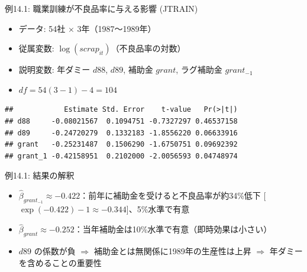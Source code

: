 \documentclass[
  ignorenonframetext,
]{beamer}
\newenvironment{Shaded}{\begin{snugshade}}{\end{snugshade}}
\newcommand{\AttributeTok}[1]{\textcolor[rgb]{0.13,0.29,0.53}{#1}}
\newcommand{\FunctionTok}[1]{\textcolor[rgb]{0.13,0.29,0.53}{\textbf{#1}}}
\newcommand{\NormalTok}[1]{#1}
\newcommand{\OtherTok}[1]{\textcolor[rgb]{0.56,0.35,0.01}{#1}}
\newcommand{\SpecialCharTok}[1]{\textcolor[rgb]{0.81,0.36,0.00}{\textbf{#1}}}
\newcommand{\StringTok}[1]{\textcolor[rgb]{0.31,0.60,0.02}{#1}}
\providecommand{\tightlist}{%
  \setlength{\itemsep}{0pt}\setlength{\parskip}{0pt}}
\begin{document}
\begin{frame}[fragile]{例14.1: 職業訓練が不良品率に与える影響 (JTRAIN)}
\label{ux4f8b14.1-ux8077ux696dux8a13ux7df4ux304cux4e0dux826fux54c1ux7387ux306bux4e0eux3048ux308bux5f71ux97ff-jtrain}
\begin{itemize}
\tightlist
\item
  データ: 54社 × 3年（1987〜1989年）
\item
  従属変数: \(\log(scrap_{it})\)（不良品率の対数）
\item
  説明変数: 年ダミー \(d88\), \(d89\), 補助金 \(grant\), ラグ補助金
  \(grant_{-1}\)
\item
  \(df = 54(3-1) - 4 = 104\)
\end{itemize}

\footnotesize

\begin{Shaded}
\end{Shaded}

\begin{verbatim}
##            Estimate Std. Error    t-value   Pr(>|t|)
## d88     -0.08021567  0.1094751 -0.7327297 0.46537158
## d89     -0.24720279  0.1332183 -1.8556220 0.06633916
## grant   -0.25231487  0.1506290 -1.6750751 0.09692392
## grant_1 -0.42158951  0.2102000 -2.0056593 0.04748974
\end{verbatim}

\normalsize
\end{frame}

\begin{frame}{例14.1: 結果の解釈}
\label{ux4f8b14.1-ux7d50ux679cux306eux89e3ux91c8}
\begin{itemize}
\tightlist
\item
  \(\hat{\beta}_{grant_{-1}} \approx -0.422\)：前年に補助金を受けると不良品率が約34\%低下
  {[}\(\exp(-0.422) - 1 \approx -0.344\){]}、5\%水準で有意
\item
  \(\hat{\beta}_{grant} \approx -0.252\)：当年補助金は10\%水準で有意（即時効果は小さい）
\item
  \(d89\) の係数が負 \(\Rightarrow\)
  補助金とは無関係に1989年の生産性は上昇 \(\Rightarrow\)
  年ダミーを含めることの重要性
\end{itemize}
\end{frame}
\end{document}
